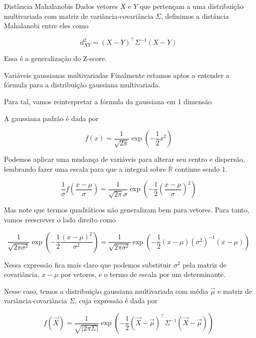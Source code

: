\documentclass[
  ignorenonframetext,
  aspectratio=169,
]{beamer}
\newcommand{\vX}{\vec{X}}
\newcommand{\vmu}{\vec{\mu}}
\begin{document}
\begin{frame}{Distância Mahalanobis}
Dados vetores \(X\) e \(Y\) que pertençam a uma distribuição
multivariada com matriz de variância-covariância \(\Sigma\), definimos a distância
Mahalanobi entre eles como

\[d_{XY}^2 = (X-Y)^\top\Sigma^{-1}(X-Y)\]

Essa é a generalização do Z-score.
\end{frame}

\begin{frame}{Variáveis gaussianas multivariadas}
Finalmente estamos aptos a entender a fórmula para a distribuição
gaussiana multivariada.

Para tal, vamos reinterpretar a fórmula da gaussiana em 1 dimensão
\end{frame}

\begin{frame}
A gaussiana padrão é dada por

\[f(x) = \frac{1}{\sqrt{2\pi}}\exp\left(-\frac{1}{2}x^2\right)\]
\end{frame}

\begin{frame}
Podemos aplicar uma mudança de variáveis para alterar seu centro e
dispersão, lembrando fazer uma escala para que a integral sobre
\(\mathbb
{R}\) continue sendo \(1\).

\[\frac{1}{\sigma}f\left(\frac{x-\mu}{\sigma}\right) = \frac{1}{\sqrt{2\pi}\sigma}\exp\left(-\frac{1}{2}\left(\frac{x-\mu}{\sigma}\right)^2\right)\]
\end{frame}

\begin{frame}
Mas note que termos quadráticos não generalizam bem para vetores. Para
tanto, vamos reescrever o lado direito como

\[\frac{1}{\sqrt{2\pi\sigma^2}}\exp\left(-\frac{1}{2}\frac{(x-\mu)^2}{\sigma^2}\right) = \frac{1}{\sqrt{2\pi\sigma^2}}\exp\left(-\frac{1}{2}(x-\mu)(\sigma^2)^{-1}(x-\mu)\right) \]
\end{frame}

\begin{frame}
Nessa expressão fica mais claro que podemos substituir \(\sigma^2\) pela
matriz de covariância, \(x-\mu\) por vetores, e o termo de escala por um
determinante.

Nesse caso, temos a distribuição gaussiana multivariada com média
\(\vec \mu\) e matriz de variância-covariância \(\Sigma\), cuja
expressão é dada por

\[f(\vX) = \frac{1}{\sqrt{|2\pi\Sigma|}}\exp\left(-\frac{1}{2}\left(\vX-\vmu\right)^\top\Sigma^{-1}\left(\vX-\vmu\right)\right) \]

 
\end{frame} 
\end{document}
